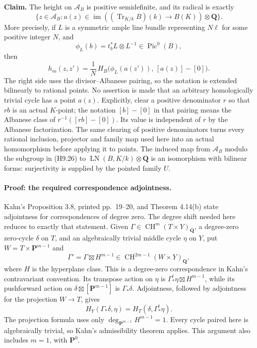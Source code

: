 \documentclass[11pt,a4paper]{article}
\begin{document}
\textbf{Claim.} The height on $\mathcal A_B$ is positive semidefinite,
and its radical is exactly
\[
 \{z\in\mathcal A_B:
      a(z)\in\operatorname{im}((\operatorname{Tr}_{K/k}B)(k)
                                  \longrightarrow B(K))
                                  \otimes\mathbf Q\}.       \tag{H9.26}
\]
More precisely, if $L$ is a symmetric ample line bundle representing
$N\ell$ for some positive integer $N$, and
\[
 \phi_L(b)=t_b^*L\otimes L^{-1}\in\operatorname{Pic}^0(B),
\]
then
\[
 h_m(z,z')=\frac1N\,
 H_B\bigl(\phi_L(a(z')),\,[a(z)]-[0]\bigr).                 \tag{H9.27}
\]
The right side uses the divisor--Albanese pairing, so the notation is
extended bilinearly to rational points. No assertion is made that an
arbitrary homologically trivial cycle has a point $a(z)$.
Explicitly, clear a positive denominator $r$ so that $rb$ is an actual
$K$-point; the notation $[b]-[0]$ in that pairing means the Albanese
class of $r^{-1}([rb]-[0])$. Its value is independent of $r$ by the
Albanese factorization. The same clearing of positive denominators
turns every rational inclusion, projector and family map used here
into an actual homomorphism before applying it to points.
The induced map from $\mathcal A_B$ modulo the subgroup in (H9.26) to
$\operatorname{LN}(B,K/k)\otimes\mathbf Q$ is an isomorphism with
bilinear forms: surjectivity is supplied by the pointed family $U$.

\paragraph{Proof: the required correspondence adjointness.}
Kahn's Proposition 3.8, printed pp.~19--20, and Theorem 4.14(b) state
adjointness for correspondences of degree zero. The degree shift needed
here reduces to exactly that statement. Given
$\Gamma\in\operatorname{CH}^{m}(T\times Y)_{\mathbf Q}$, a degree-zero
zero-cycle $\delta$ on $T$, and an algebraically trivial middle cycle
$\eta$ on $Y$, put $W=T\times\mathbf P^{m-1}$ and
\[
 \Gamma'=\Gamma\boxtimes H^{m-1}
   \in\operatorname{CH}^{2m-1}(W\times Y)_{\mathbf Q},
\]
where $H$ is the hyperplane class. This is a degree-zero
correspondence in Kahn's contravariant convention. Its transpose action
on $\eta$ is $\Gamma^t_*\eta\boxtimes H^{m-1}$, while its pushforward
action on $\delta\boxtimes[\mathbf P^{m-1}]$ is $\Gamma_*\delta$.
Adjointness, followed by adjointness for the projection $W\to T$, gives
\[
 H_Y(\Gamma_*\delta,\eta)
    =H_T(\delta,\Gamma^t_*\eta).                            \tag{H9.28}
\]
The projection formula uses only
$\deg_{\mathbf P^{m-1}}H^{m-1}=1$. Every cycle paired here is
algebraically trivial, so Kahn's admissibility theorem applies. This
argument also includes $m=1$, with $\mathbf P^0$.
\end{document}
